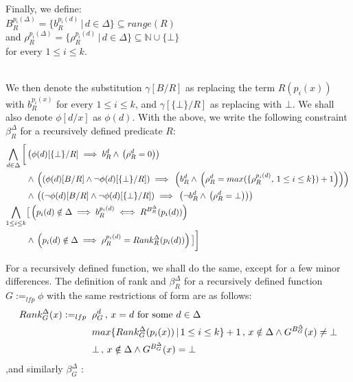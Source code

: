 \documentclass[12pt]{article} %
\begin{document}
Finally, we define:\\
$B_{R}^{p_i(\Delta)} = \{ b_R^{p_i(d)} \,|\, d \in{} \Delta{} \} \subseteq{} range(R)$\\
and $\rho_{R}^{p_i(\Delta)} = \{ \rho_{R}^{p_i(d)} \,|\, d \in{} \Delta{} \} \subseteq{} \mathbb{N} \cup{} \{\bot{}\}$\\
for every $1\leq{} i \leq{}k$.\\\

We then denote the substitution $\gamma[B/R]$ as replacing the term $R(p_i(x))$ with $b_{R}^{p_i(x)}$ for every $1\leq{} i \leq{}k$, and $\gamma[\{\bot{}\}/R]$ as replacing with $\bot{}$. We shall also denote $\phi{}[d/x]$ as $\phi(d)$.
With the above, we write the following constraint $\beta_{R}^{\Delta}$ for a recursively defined predicate $R$:\\
\begin{align*}
\bigwedge\limits_{d \in{} \Delta} \bigg\lbrack{} & \left( \phi{}(d)[\{\bot{}\}/R] \implies{} b_{R}^{d} \land{} \left(\rho_{R}^{d} = 0\right) \right)\notag{}\\
&\land{}  \left( \left( \phi{}(d)[B/R] \land{} \neg{}\phi{}(d)[\{\bot{}\}/R] \right) \implies{} \left( b_{R}^{d} \land{} \left(\rho_{R}^{d} = max(\{\rho_{R}^{p_i(d)},\, 1 \leq{} i \leq{} k\}) + 1 \right)\right)  \right) \notag{}\\
& \land{}  \left( \left( \neg{}\phi{}(d)[B/R] \land{} \neg{}\phi{}(d)[\{\bot{}\}/R] \right) \implies{} \left( \neg{}b_{R}^{d} \land{} \left(\rho_{R}^{d} = \bot{} \right)\right) \right) \notag{}\\
\bigwedge\limits_{1 \leq{} i \leq{} k} & \big\lbrack{} \left(p_i(d) \notin{} \Delta{} \implies{} b_{R}^{p_i(d)} \iff{}  R^{B_R^{\Delta}}(p_i(d)) \right) \notag{}\\
& \land{} \left(p_i(d) \notin{} \Delta{} \implies{} \rho_{R}^{p_i(d)} =  Rank_{R}^{\Delta}(p_i(d)) \right) \big\rbrack{} \bigg\rbrack{} \notag{} 
\end{align*}

For a recursively defined function, we shall do the same, except for a few minor differences. The definition of rank and $\beta_{R}^{\Delta}$ for a recursively defined function $G :=_{lfp} \phi{}$ with the same restrictions of form are as follows:\\

\begin{align}
Rank_{G}^{\Delta}(x) :=_{lfp} &\;\; \rho_{G}^{d}\,,\, x = d \textrm{ for some } d \in{}\Delta{}\notag{}\\
&\;\; max\{Rank_{G}^{\Delta}(p_i(x)) \,|\, 1 \leq{} i \leq{} k\} + 1\,,\, x \notin{} \Delta{} \land{} G^{B_{G}^{\Delta}}(x) \neq{} \bot{} \notag{}\\
&\;\; \bot{} \,,\, x \notin{} \Delta{} \land{} G^{B_{G}^{\Delta}}(x) = \bot{}\notag{}
\end{align}
,and similarly $\beta_{G}^{\Delta}$ :\\
\end{document}
